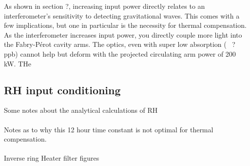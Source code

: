 

As shown in section ?,  increasing input power directly relates to an interferometer's sensitivity to detecting gravitational waves. This comes with a few implications, but one in particular is the necessity for thermal compensation. As the interferometer increases input power, you directly couple more light into the Fabry-P\'{e}rot cavity arms. The optics, even with super low absorption (~ ? ppb) cannot help but deform with the projected circulating arm power of 200 kW. THe
\subsection{RH input conditioning}
Some notes about the analytical calculations of RH
\\
\\
Notes as to why this 12 hour time constant is not optimal for thermal compensation.
\\
\\
Inverse ring Heater filter figures
